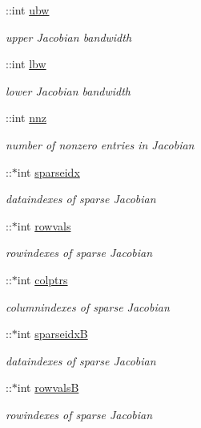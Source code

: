 \begin{DoxyCompactItemize}
\+::int \hyperlink{classamimodel_a955c9d10635afed4ebc04c60010e5d40}{ubw}
\begin{DoxyCompactList}\small\item\em upper Jacobian bandwidth \end{DoxyCompactList}\item 
\+::int \hyperlink{classamimodel_a784f5fb2b8eda576179be087c2a09a39}{lbw}
\begin{DoxyCompactList}\small\item\em lower Jacobian bandwidth \end{DoxyCompactList}\item 
\+::int \hyperlink{classamimodel_a825ec588729c090ff51ea3473dcbc6b9}{nnz}
\begin{DoxyCompactList}\small\item\em number of nonzero entries in Jacobian \end{DoxyCompactList}\item 
\+::$\ast$int \hyperlink{classamimodel_a6ffb112eda9ff756e17104210981b30b}{sparseidx}
\begin{DoxyCompactList}\small\item\em dataindexes of sparse Jacobian \end{DoxyCompactList}\item 
\+::$\ast$int \hyperlink{classamimodel_aa0abea3560da3f409a28567f42d52872}{rowvals}
\begin{DoxyCompactList}\small\item\em rowindexes of sparse Jacobian \end{DoxyCompactList}\item 
\+::$\ast$int \hyperlink{classamimodel_a887e8a11654afa197d040d8bb10cbb38}{colptrs}
\begin{DoxyCompactList}\small\item\em columnindexes of sparse Jacobian \end{DoxyCompactList}\item 
\+::$\ast$int \hyperlink{classamimodel_adcfae93a688a66f1954d0832f51e4cc0}{sparseidx\+B}
\begin{DoxyCompactList}\small\item\em dataindexes of sparse Jacobian \end{DoxyCompactList}\item 
\+::$\ast$int \hyperlink{classamimodel_a1ba81ee0e28fe7c7576911973c82be70}{rowvals\+B}
\begin{DoxyCompactList}\small\item\em rowindexes of sparse Jacobian \end{DoxyCompactList}\item 

\end{DoxyCompactItemize}
